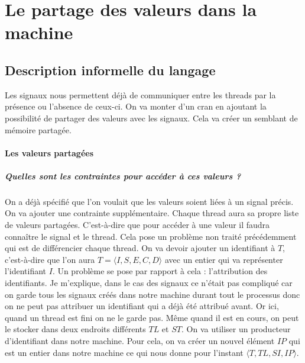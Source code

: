 \documentclass[10pt,a4paper]{report}
\begin{document}
	
	\section{Le partage des valeurs dans la machine}
	
	\subsection{Description informelle du langage}
	Les signaux nous permettent déjà de communiquer entre les threads par la présence ou l'absence de ceux-ci. On va monter d'un cran en ajoutant la possibilité de partager des valeurs avec les signaux. Cela va créer un semblant de mémoire partagée.
	\medbreak
	
	\paragraph{Les valeurs partagées}
	
	\subparagraph{Quelles sont les contraintes pour accéder à ces valeurs ?}
	On a déjà spécifié que l'on voulait que les valeurs soient liées à un signal précis. On va ajouter une contrainte supplémentaire. Chaque thread aura sa propre liste de valeurs partagées. C'est-à-dire que pour accéder à une valeur il faudra connaître le signal et le thread. Cela pose un problème non traité précédemment qui est de différencier chaque thread. On va devoir ajouter un identifiant à $T$, c'est-à-dire que l'on aura $T = \langle I,S,E,C,D\rangle$ avec un entier qui va représenter l'identifiant $I$. Un problème se pose par rapport à cela : l'attribution des identifiants.
	\smallbreak
	Je m'explique, dans le cas des signaux ce n'était pas compliqué car on garde tous les signaux créés dans notre machine durant tout le processus donc on ne peut pas attribuer un identifiant qui a déjà été attribué avant. Or ici, quand un thread est fini on ne le garde pas. Même quand il est en cours, on peut le stocker dans deux endroits différents $TL$ et $ST$. On va utiliser un producteur d'identifiant dans notre machine. Pour cela, on va créer un nouvel élément $IP$ qui est un entier dans notre machine ce qui nous donne pour l'instant $\langle T,TL,SI,IP\rangle$.
	\medbreak
	
\end{document}
